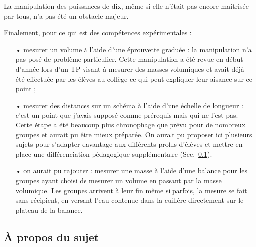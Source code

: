\documentclass[12pt,a4paper, fleqn]{report}
\begin{document}
La manipulation des puissances de dix, même si elle n'était pas encore maitrisée par tous, n'a pas été un obstacle majeur.

Finalement, pour ce qui est des compétences expérimentales :
\begin{itemize}
\item[•] mesurer un volume à l'aide d'une éprouvette graduée : la manipulation n'a pas posé de problème particulier.
Cette manipulation a été revue en début d'année lors d'un TP visant à mesurer des masses volumiques et avait déjà été effectuée par les élèves au collège ce qui peut expliquer leur aisance sur ce point ;
\item[•] mesurer des distances sur un schéma à l'aide d'une échelle de longueur : c'est un point que j'avais supposé comme prérequis mais qui ne l'est pas.
Cette étape a été beaucoup plus chronophage que prévu pour de nombreux groupes et aurait pu être mieux préparée.
On aurait pu proposer ici plusieurs sujets pour s'adapter davantage aux différents profils d'élèves et mettre en place une différenciation pédagogique supplémentaire (Sec.~\ref{sec:sujet}).
\item[•] on aurait pu rajouter : mesurer une masse à l'aide d'une balance pour les groupes ayant choisi de mesurer un volume en passant par la masse volumique.
Les groupes arrivent à leur fin même si parfois, la mesure se fait sans récipient, en versant l'eau contenue dans la cuillère directement sur le plateau de la balance.
\end{itemize}

\subsection{À propos du sujet}
\label{sec:sujet}
\end{document}
